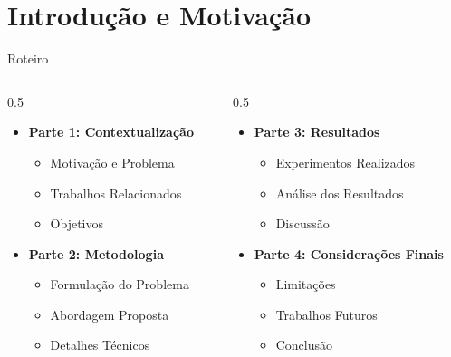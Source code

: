 \section{Introdução e Motivação}

\begin{frame}{Roteiro}
  \begin{columns}
    \begin{column}{0.5\textwidth}
      \begin{itemize}
        \item \textbf{Parte 1: Contextualização}
        \begin{itemize}
          \item Motivação e Problema
          \item Trabalhos Relacionados
          \item Objetivos
        \end{itemize}
        \vspace{0.3cm}
        \item \textbf{Parte 2: Metodologia}
        \begin{itemize}
          \item Formulação do Problema
          \item Abordagem Proposta
          \item Detalhes Técnicos
        \end{itemize}
      \end{itemize}
    \end{column}
    \begin{column}{0.5\textwidth}
      \begin{itemize}
        \item \textbf{Parte 3: Resultados}
        \begin{itemize}
          \item Experimentos Realizados
          \item Análise dos Resultados
          \item Discussão
        \end{itemize}
        \vspace{0.3cm}
        \item \textbf{Parte 4: Considerações Finais}
        \begin{itemize}
          \item Limitações
          \item Trabalhos Futuros
          \item Conclusão
        \end{itemize}
      \end{itemize}
    \end{column}
  \end{columns}
\end{frame}

